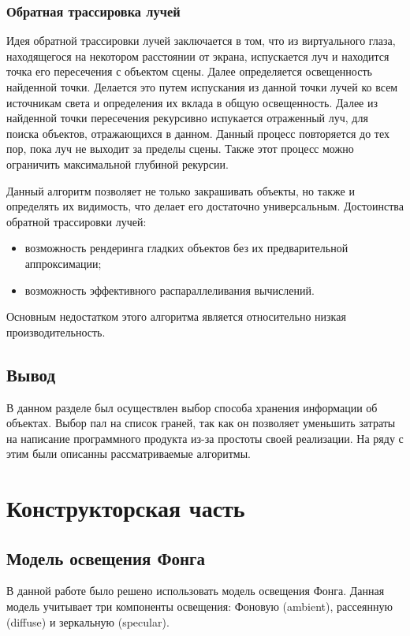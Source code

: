 \documentclass[12pt]{report}
\begin{document}
	\subsection{Обратная трассировка лучей}
	Идея обратной трассировки лучей заключается в том, что из виртуального глаза, находящегося на некотором расстоянии от экрана, испускается луч и находится точка его пересечения с объектом сцены. Далее определяется освещенность найденной точки. Делается это путем испускания из данной точки лучей ко всем источникам света и определения их вклада в общую освещенность. Далее из найденной точки пересечения рекурсивно испукается отраженный луч, для поиска объектов, отражающихся в данном. Данный процесс повторяется до тех пор, пока луч не выходит за пределы сцены. Также этот процесс можно ограничить максимальной глубиной рекурсии.\cite{6}
	
	Данный алгоритм позволяет не только закрашивать объекты, но также и определять их видимость, что делает его достаточно универсальным.
	Достоинства обратной трассировки лучей:
	\begin{itemize}
		\item возможность рендеринга гладких объектов без их предварительной аппроксимации;
		\item возможность эффективного распараллеливания вычислений.
	\end{itemize}

	Основным недостатком этого алгоритма является относительно низкая производительность.
	
	\section*{Вывод}
	
	В данном разделе был осуществлен выбор способа хранения информации об объектах. Выбор пал на список граней, так как он позволяет уменьшить затраты на написание программного продукта из-за простоты своей реализации. На ряду с этим были описанны рассматриваемые алгоритмы.
	
	\chapter{Конструкторская часть}
	\section{Модель освещения Фонга}
	
	В данной работе было решено использовать модель освещения Фонга. Данная модель учитывает три компоненты освещения: Фоновую (ambient), рассеянную (diffuse) и зеркальную (specular).
		
\end{document}
